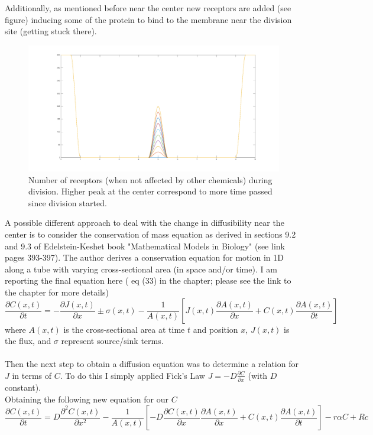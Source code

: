 \documentclass[12pt]{article}
\begin{document}
Additionally, as mentioned before near the center new receptors are added (see figure) inducing some of the protein to bind to the membrane near the division site (getting stuck there). 

\begin{figure}[H]
    \centering
    \includegraphics[width=1.2\textwidth]{receptors.jpeg}
    \caption{Number of receptors (when not affected by other chemicals) during division. Higher peak at the center correspond to more time passed since division started. }
    \label{fig20}
\end{figure}

A possible different approach to deal with the change in diffusibility near the center is to consider the conservation of mass equation as derived in sections 9.2 and 9.3 of Edelstein-Keshet book "Mathematical Models in Biology" (see link pages 393-397). The author derives a conservation equation for motion in 1D along a tube with varying cross-sectional area (in space and/or time). I am reporting the final equation here ( eq (33) in the chapter; please see the link to the chapter for more details)
\begin{equation}
\frac{\partial C(x,t)}{\partial t}=-\frac{\partial J(x,t)}{\partial x}\pm\sigma(x,t)-\frac{1}{A(x,t)}\left[J(x,t)\frac{\partial A(x,t)}{\partial x}+C(x,t)\frac{\partial A(x,t)}{\partial t}\right]
\end{equation}
where $A(x,t)$ is the cross-sectional area at time $t$ and position $x$, $J(x,t)$ is the flux, and $\sigma$ represent source/sink terms.\\\\
Then the next step to obtain a diffusion equation was to determine a relation for $J$ in terms of $C$. To do this I simply applied Fick's Law $J = -D \frac{\partial C}{\partial x} $ (with $D$ constant).
\\
Obtaining the following new equation for our $C$
\begin{equation}
\frac{\partial C(x,t)}{\partial t}= D\frac{\partial^2 C(x,t)}{\partial x^2}-\frac{1}{A(x,t)}\left[-D\frac{\partial C(x,t)}{\partial x}\frac{\partial A(x,t)}{\partial x}+C(x,t)\frac{\partial A(x,t)}{\partial t}\right]- r\alpha C+R c
\end{equation}
\end{document}
